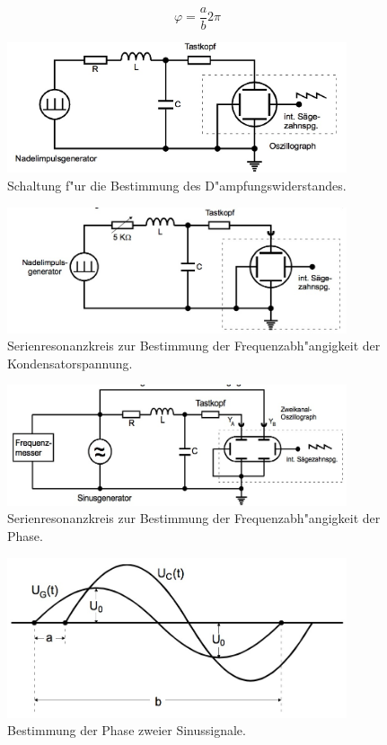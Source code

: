 	\begin{equation*}
		\varphi = \frac{a}{b} 2 \pi
	\end{equation*}

	\begin{figure}[h!]
		\centering
		\includegraphics[width = 10cm]{img/aufbaua.JPG}
		\caption{Schaltung f"ur die Bestimmung des D"ampfungswiderstandes. \cite{anleitung}}
		\label{aufbau_a}
	\end{figure}

	\begin{figure}[h!]
		\centering
		\includegraphics[width = 10cm]{img/aufbaub.JPG}
		\caption{Serienresonanzkreis zur Bestimmung der Frequenzabh"angigkeit der Kondensatorspannung. \cite{anleitung}}
		\label{aufbau_b}
	\end{figure}

	\begin{figure}[h!]
		\centering
		\includegraphics[width = 10cm]{img/aufbauc.JPG}
		\caption{Serienresonanzkreis zur Bestimmung der Frequenzabh"angigkeit der Phase. \cite{anleitung}}
		\label{aufbau_c}
	\end{figure}

	\begin{figure}[h!]
		\centering
		\includegraphics[width = 10cm]{img/phase.JPG}
		\caption{Bestimmung der Phase zweier Sinussignale. \cite{anleitung}}
		\label{fig:phase}
	\end{figure}

	\clearpage